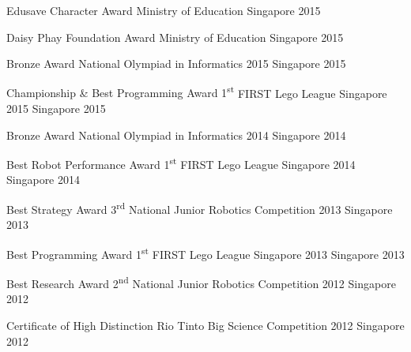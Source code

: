 \begin{cvhonors}

  \cvhonor
    {Edusave Character Award} %
    {Ministry of Education} %
    {Singapore} %
    {2015} %

  \cvhonor
    {Daisy Phay Foundation Award} %
    {Ministry of Education} %
    {Singapore} %
    {2015} %

  \cvhonor
    {Bronze Award} %
    {National Olympiad in Informatics 2015} %
    {Singapore} %
    {2015} %
    
  \cvhonor
    {Championship \& Best Programming Award 1\textsuperscript{st}} %
    {FIRST Lego League Singapore 2015} %
    {Singapore} %
    {2015} %

  \cvhonor
    {Bronze Award} %
    {National Olympiad in Informatics 2014} %
    {Singapore} %
    {2014} %

  \cvhonor
    {Best Robot Performance Award 1\textsuperscript{st}} %
    {FIRST Lego League Singapore 2014} %
    {Singapore} %
    {2014} %
    
  \cvhonor
    {Best Strategy Award 3\textsuperscript{rd}} %
    {National Junior Robotics Competition 2013} %
    {Singapore} %
    {2013} %
    
  \cvhonor
    {Best Programming Award 1\textsuperscript{st}} %
    {FIRST Lego League Singapore 2013} %
    {Singapore} %
    {2013} %
    
  \cvhonor
    {Best Research Award 2\textsuperscript{nd}} %
    {National Junior Robotics Competition 2012} %
    {Singapore} %
    {2012} %
    
  \cvhonor
    {Certificate of High Distinction} %
    {Rio Tinto Big Science Competition 2012} %
    {Singapore} %
    {2012} %
    

\end{cvhonors}
